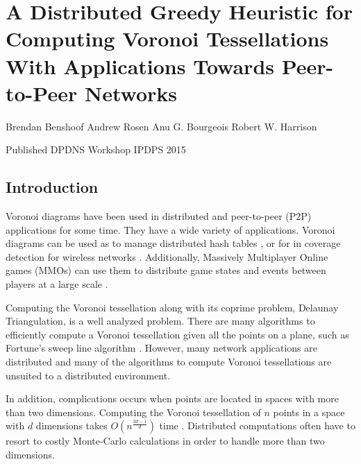 

\chapter{A Distributed Greedy Heuristic for Computing Voronoi Tessellations With Applications Towards Peer-to-Peer Networks}
\begin{center}
Brendan Benshoof \qquad Andrew Rosen \qquad Anu G. Bourgeois \qquad Robert W. Harrison


Published DPDNS Workshop IPDPS 2015
\end{center}






\section{Introduction}
\label{sec:intro}

Voronoi diagrams \cite{voronoi} have been used in distributed and  peer-to-peer (P2P) applications for some time. 
They have a wide variety of applications.
Voronoi diagrams can be used as to manage distributed hash tables \cite{virtvoro}, or for in coverage detection for wireless networks \cite{carbunar2004distributed}.
Additionally, Massively Multiplayer Online games (MMOs) can use them to distribute game states and events between players at a large scale \cite{hu2004scalable} \cite{hu2008voronoi} \cite{Backhaus:2007:VAS:1326257.1326266}.

Computing the Voronoi tessellation along with its coprime problem, Delaunay Triangulation, is a well analyzed problem.
There are many algorithms to efficiently compute a Voronoi tessellation given all the points on a plane, such as Fortune's sweep line algorithm \cite{fortune1987sweepline}.
However, many network applications are distributed and many of the algorithms to compute Voronoi tessellations are unsuited to a distributed environment.

In addition, complications occurs when points are located in spaces with more than two dimensions.
Computing the Voronoi tessellation of $n$ points in a space with $d$ dimensions takes $O(n^{\frac{2d-1}{d}})$ time \cite{watson1981computing}.
Distributed computations often have to resort to costly Monte-Carlo calculations \cite{raynet} in order to handle more than two dimensions.

